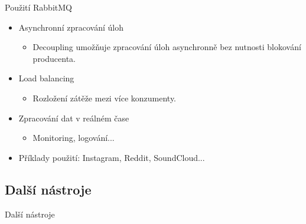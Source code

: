 \documentclass{beamer}
\begin{document}
\begin{frame}{Použití RabbitMQ}
	\begin{itemize}
		\item Asynchronní zpracování úloh
		\begin{itemize}
			\item [\textendash] Decoupling umožňuje zpracování úloh asynchronně bez nutnosti blokování producenta.
		\end{itemize}
		\item Load balancing
		\begin{itemize}
			\item [\textendash] Rozložení zátěže mezi více konzumenty.
		\end{itemize}
		\item Zpracování dat v reálném čase
		\begin{itemize}
			\item [\textendash] Monitoring, logování...
		\end{itemize}
		\item Příklady použití: Instagram, Reddit, SoundCloud...
	\end{itemize}
\end{frame}

\subsection{Další nástroje}
\begin{frame}{Další nástroje}

\end{frame}
\end{document}
